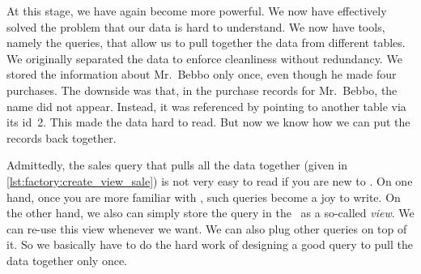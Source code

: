 At this stage, we have again become more powerful.
We now have effectively solved the problem that our data is hard to understand.
We now have tools, namely the  queries, that allow us to pull together the data from different tables.
We originally separated the data to enforce cleanliness without redundancy.
We stored the information about Mr.~Bebbo only once, even though he made four purchases.
The downside was that, in the purchase records for Mr.~Bebbo, the name  did not appear.
Instead, it was referenced by pointing to another table via its id~2.
This made the data hard to read.
But now we know how we can put the records back together.

Admittedly, the sales query that pulls all the data together (given in \cref{lst:factory:create_view_sale}) is not very easy to read if you are new to \sql.
On one hand, once you are more familiar with \sql, such queries become a joy to write.
On the other hand, we also can simply store the query in the \db\ as a so-called \emph{view}.
We can re-use this view whenever we want.
We can also plug other queries on top of it.
So we basically have to do the hard work of designing a good query to pull the data together only once.%
%
\FloatBarrier%
\endhsection%
\endhsection%
%
